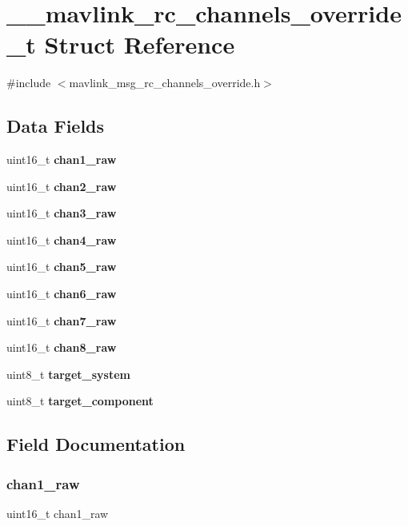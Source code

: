 \section{\+\_\+\+\_\+mavlink\+\_\+rc\+\_\+channels\+\_\+override\+\_\+t Struct Reference}
\label{struct____mavlink__rc__channels__override__t}


{\ttfamily \#include $<$mavlink\+\_\+msg\+\_\+rc\+\_\+channels\+\_\+override.\+h$>$}

\subsection*{Data Fields}
\begin{DoxyCompactItemize}
\item 
uint16\+\_\+t \textbf{ chan1\+\_\+raw}
\item 
uint16\+\_\+t \textbf{ chan2\+\_\+raw}
\item 
uint16\+\_\+t \textbf{ chan3\+\_\+raw}
\item 
uint16\+\_\+t \textbf{ chan4\+\_\+raw}
\item 
uint16\+\_\+t \textbf{ chan5\+\_\+raw}
\item 
uint16\+\_\+t \textbf{ chan6\+\_\+raw}
\item 
uint16\+\_\+t \textbf{ chan7\+\_\+raw}
\item 
uint16\+\_\+t \textbf{ chan8\+\_\+raw}
\item 
uint8\+\_\+t \textbf{ target\+\_\+system}
\item 
uint8\+\_\+t \textbf{ target\+\_\+component}
\end{DoxyCompactItemize}


\subsection{Field Documentation}
\mbox{\label{struct____mavlink__rc__channels__override__t_aca17d85a81b611116663950e842e0827}} 
\subsubsection{chan1\+\_\+raw}
{\footnotesize\ttfamily uint16\+\_\+t chan1\+\_\+raw}

